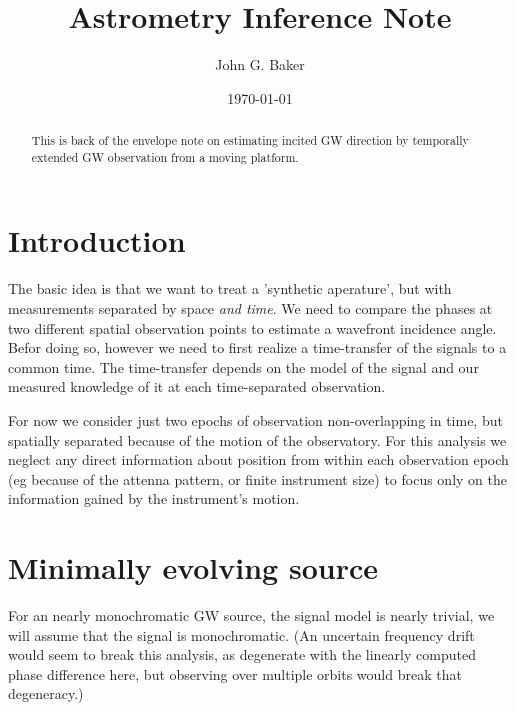 \documentclass[aps,showpacs,12pt,onecolumn,prd,superscriptaddress,nofootinbib]{revtex4}
\begin{document}
\title{Astrometry Inference Note}

\author{John G. Baker}


\date{\today}

\begin{abstract}

This is back of the envelope note on estimating incited GW direction by temporally extended GW observation from a moving platform.

\end{abstract}


\maketitle


\section{Introduction}

The basic idea is that we want to treat a 'synthetic aperature', but with measurements separated by space \emph{and time}. We need to compare the phases at two different spatial observation points to estimate a wavefront incidence angle. Befor doing so, however we need to first realize a time-transfer of the signals to a common time.  The time-transfer depends on the model of the signal and our measured knowledge of it at each time-separated observation.

For now we consider just two epochs of observation non-overlapping in time, but spatially separated because of the motion of the observatory. For this analysis we neglect any direct information about position from within each observation epoch (eg because of the attenna pattern, or finite instrument size) to focus only on the information gained by the instrument's motion.

\section{Minimally evolving source}

For an nearly monochromatic GW source, the signal model is nearly trivial, we will assume that the signal is monochromatic.
(An uncertain frequency drift would seem to break this analysis, as degenerate with the linearly computed phase difference
here, but observing over multiple orbits would break that degeneracy.)
\end{document}
